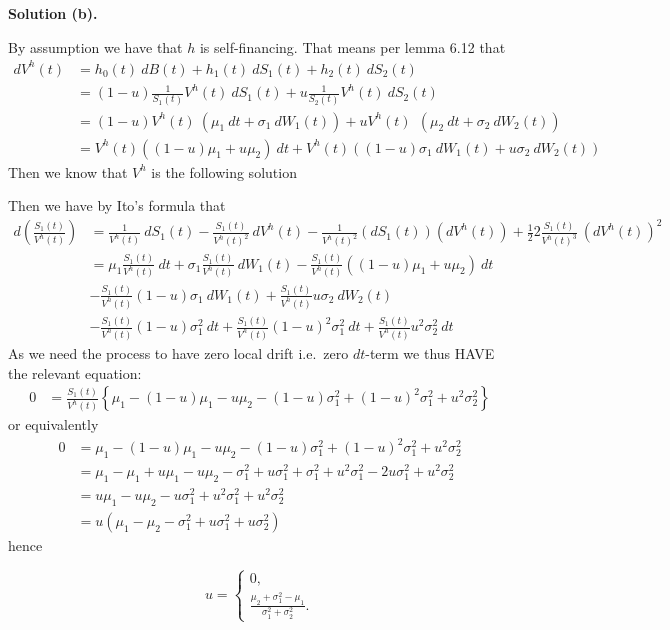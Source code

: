 \documentclass[a4paper,12pt,openany]{book}
\begin{document}
\noindent\makebox[\linewidth]{\rule{\textwidth}{0.4pt}}

\textbf{Solution (b).}

By assumption we have that \(h\) is self-financing. That means per lemma 6.12 that
\begin{align*}
dV^h(t)&=h_0(t)\ dB(t)+h_1(t)\ dS_1(t)+h_2(t)\ dS_2(t)\\
&=(1-u)\frac{1}{S_1(t)}V^h(t)\ dS_1(t)+u\frac{1}{S_2(t)}V^h(t)\ dS_2(t)\\
&=(1-u)V^h(t)\ (\mu_1 \ dt+\sigma_1\ dW_1(t))+uV^h(t)\ \ (\mu_2 \ dt+\sigma_2\ dW_2(t))\\
&=V^h(t)\left((1-u)\mu_1+u\mu_2\right)\ dt+V^h(t)\left((1-u)\sigma_1\ dW_1(t)+u\sigma_2\ dW_2(t)\right)
\end{align*}
Then we know that \(V^h\) is the following solution

Then we have by Ito's formula that
\begin{align*}
d\left(\frac{S_1(t)}{V^h(t)}\right)&=\frac{1}{V^h(t)}\ dS_1(t)-\frac{S_1(t)}{V^h(t)^2}\ dV^h(t)-\frac{1}{V^h(t)^2}(dS_1(t))(dV^h(t))+\frac{1}{2}2\frac{S_1(t)}{V^h(t)^3}\ (dV^h(t))^2\\
&=\mu_1\frac{S_1(t)}{V^h(t)}\ dt+\sigma_1 \frac{S_1(t)}{V^h(t)}\ dW_1(t)-\frac{S_1(t)}{V^h(t)}((1-u)\mu_1+u\mu_2)\ dt\\
&-\frac{S_1(t)}{V^h(t)}(1-u)\sigma_1\ dW_1(t)+\frac{S_1(t)}{V^h(t)}u\sigma_2\ dW_2(t)\\
&-\frac{S_1(t)}{V^h(t)}(1-u)\sigma_1^2\ dt+\frac{S_1(t)}{V^h(t)}(1-u)^2\sigma_1^2\ dt+\frac{S_1(t)}{V^h(t)}u^2\sigma_2^2\ dt
\end{align*}
As we need the process to have zero local drift i.e.~zero \(dt\)-term we thus HAVE the relevant equation:
\begin{align*}
0&=\frac{S_1(t)}{V^h(t)}\left\{\mu_1-(1-u)\mu_1-u\mu_2-(1-u)\sigma_1^2+(1-u)^2\sigma_1^2+u^2\sigma_2^2\right\}
\end{align*}
or equivalently
\begin{align*}
0&=\mu_1-(1-u)\mu_1-u\mu_2-(1-u)\sigma_1^2+(1-u)^2\sigma_1^2+u^2\sigma_2^2\\
&=\mu_1-\mu_1+u\mu_1-u\mu_2-\sigma_1^2+u\sigma_1^2+\sigma_1^2+u^2\sigma_1^2-2u\sigma_1^2+u^2\sigma_2^2\\
&=u\mu_1-u\mu_2-u\sigma_1^2+u^2\sigma_1^2+u^2\sigma_2^2\\
&=u(\mu_1-\mu_2-\sigma_1^2+u\sigma_1^2+u\sigma_2^2)
\end{align*}
hence

\[
u=\begin{cases}
0,\\
\frac{\mu_2+\sigma_1^2-\mu_1}{\sigma_1^2+\sigma_2^2}.
\end{cases}
\]
\end{document}

